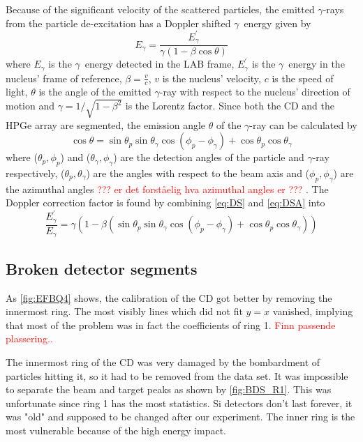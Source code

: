 \documentclass[twoside,english]{uiofysmaster/uiofysmaster}
\newcommand{\ga}{$\gamma$}
\let\orgautoref\autoref
\renewcommand{\autoref}
        {%
		 \def\sectionautorefname{Section}%
		 \def\subsectionautorefname{Section}%
		 \def\subsubsectionautorefname{Section}%
		 \def\chapterautorefname{Chapter}%
          \orgautoref}
\begin{document}
Because of the significant velocity of the scattered particles, the emitted \ga-rays from the particle de-excitation has a Doppler shifted \ga\ energy given by 
\begin{equation}\label{eq:DS}
	E_\gamma = \frac{E_\gamma^{'}}{\gamma (1 - \beta \cos \theta)}
\end{equation}
where $E_\gamma$ is the \ga\ energy detected in the LAB frame, $E_\gamma^{'}$ is the \ga\ energy in the nucleus' frame of reference, $\beta = \frac{v}{c}$, $v$ is the nucleus' velocity, $c$ is the speed of light, $\theta$ is the angle of the emitted \ga-ray with respect to the nucleus' direction of motion and $\gamma = 1/\sqrt{1 - \beta^2}$ is the Lorentz factor. Since both the CD and the HPGe array are segmented, the emission angle $\theta$ of the \ga-ray can be calculated by 
\begin{equation}\label{eq:DSA}
	\cos \theta = \sin \theta_p \sin \theta_\gamma \cos (\phi_p - \phi_\gamma) + \cos \theta_p \cos \theta_\gamma
\end{equation}
where ($\theta_p, \phi_p$) and ($\theta_\gamma, \phi_\gamma$) are the detection angles of the particle and \ga-ray respectively, ($\theta_p, \theta_\gamma$) are the angles with respect to the beam axis and ($\phi_p, \phi_\gamma$) are the azimuthal angles \textcolor{red}{??? er det forståelig hva azimuthal angles er ???} \cite{RIBF2012, MB-spect}. The Doppler correction factor is found by combining \autoref{eq:DS} and \autoref{eq:DSA} into
\begin{equation}
	\frac{E_\gamma^{'}}{E_\gamma} = \gamma (1 - \beta (\sin \theta_p \sin \theta_\gamma \cos (\phi_p - \phi_\gamma) + \cos \theta_p \cos \theta_\gamma))
\end{equation}





\subsection{Broken detector segments}\label{sec:BDS}
As \autoref{fig:EFBQ4} shows, the calibration of the CD got better by removing the innermost ring. 
The most visibly lines which did not fit $y = x$ vanished, implying that most of the problem was in fact the coefficients of ring 1. \textcolor{red}{Finn passende plassering..}

\bigskip


The innermost ring of the CD was very damaged by the bombardment of particles hitting it, so it had to be removed from the data set. 
It was impossible to separate the beam and target peaks as shown by \autoref{fig:BDS_R1}.
This was unfortunate since ring 1 has the most statistics. 
Si detectors don't last forever, it was "old" and supposed to be changed after our experiment. 
The inner ring is the most vulnerable because of the high energy impact. 
\end{document}
